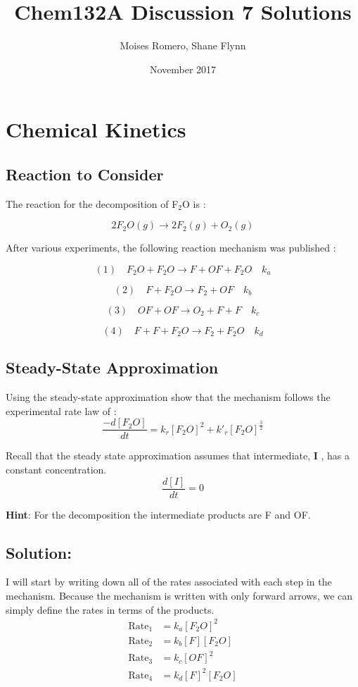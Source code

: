 \documentclass{article}
\title{Chem132A Discussion 7 Solutions}
\author{Moises Romero, Shane Flynn}
\date{November 2017}
\newcommand{\be}{\begin{equation}}
\newcommand{\ee}{\end{equation}}
\begin{document}
\maketitle
\section{Chemical Kinetics}
\subsection*{Reaction to Consider}
The reaction for the decomposition of F$_2$O is : 

\be
2F_2O(g) \rightarrow 2F_2(g) + O_2(g)
\ee

After various experiments, the following reaction mechanism was published :  

\be
(1) \quad F_2O + F_2O \rightarrow  F + OF + F_2O \quad k_a 
\ee

\be
(2) \quad F + F_2O \rightarrow F_2 + OF \quad k_b 
\ee

\be 
(3) \quad OF + OF \rightarrow O_2 + F + F \quad k_c
\ee

\be
(4) \quad F + F + F_2O \rightarrow F_2 + F_2O \quad k_d
\ee

\subsection{Steady-State Approximation}

Using the steady-state approximation show that the mechanism follows the experimental rate law of : 
\be
\frac{-d[F_2O]}{dt} = k_r[F_2O]^2 + k'_r[F_2O]^{\frac{3}{2}}
\ee

Recall that the steady state approximation assumes that intermediate, \textbf{I} , has a constant concentration.   
\be
\frac{d[I]}{dt} = 0 
\ee

\textbf{Hint}: For the decomposition the intermediate products are F and OF. 

\subsection*{Solution:}
I will start by writing down all of the rates associated with each step in the mechanism. 
Because the mechanism is written with only forward arrows, we can simply define the rates in terms of the products. 
\be
\begin{split}
    \text{Rate}_1 &= k_a[F_2O]^2\\
    \text{Rate}_2 &= k_b[F][F_2O] \\
    \text{Rate}_3 &= k_c[OF]^2 \\
    \text{Rate}_4 &= k_d[F]^2[F_2O] \\
\end{split}
\ee
\end{document}
